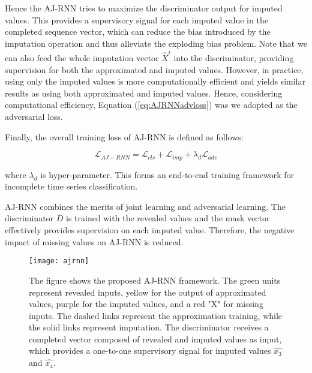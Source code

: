 Hence the AJ-RNN tries to maximize the discriminator output for imputed values.
This provides a supervisory signal for each imputed value in the completed sequence vector, which can reduce the bias introduced by the imputation operation and thus alleviate the exploding bias problem.
Note that we can also feed the whole imputation vector $\hat{X}^i$ into the discriminator, providing supervision for both the approximated and imputed values. 
However, in practice, using only the imputed values is more computationally efficient and yields similar results as using both approximated and imputed values. 
Hence, considering computational efficiency, Equation (\ref{eq:AJRNNadvloss}) was we adopted as the adversarial loss.

Finally, the overall training loss of AJ-RNN is defined as follows:

\begin{equation}
  \mathcal{L}_{AJ-RNN} = \mathcal{L}_{cls} + \mathcal{L}_{imp} + \lambda_d \mathcal{L}_{adv}
  \label{eq:AJRNNloss}
\end{equation}

where $\lambda_d$ is hyper-parameter. 
This forms an end-to-end training framework for incomplete time series classification.

AJ-RNN combines the merits of joint learning and adversarial learning.
The discriminator $D$ is trained with the revealed values and the mask vector effectively provides supervision on each imputed value. 
Therefore, the negative impact of missing values on AJ-RNN is reduced.

\begin{figure}[H]
  \centering
  \texttt{[image: ajrnn]}
  \caption{The figure shows the proposed AJ-RNN framework. The green units represent revealed inputs, yellow for the output of approximated values, purple for the imputed values, and a red "X" for missing inputs. The dashed links represent the approximation training, while the solid links represent imputation. The discriminator receives a completed vector composed of revealed and imputed values as input, which provides a one-to-one supervisory signal for imputed values $\hat{x_3}$ and $\hat{x_4}$.}
  \label{fig:AJRNNrchitecture}
\end{figure}